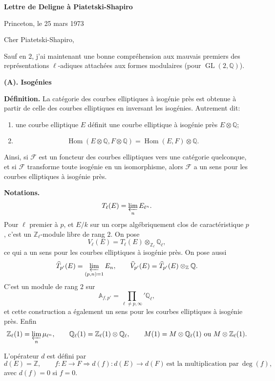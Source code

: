 \documentclass[11pt]{article}
\newcommand{\Q}{\mathbb{Q}}
\newcommand{\Z}{\mathbb{Z}}
\newcommand{\Ql}{\mathbb{Q}_{\ell}}
\newcommand{\Zl}{\mathbb{Z}_{\ell}}
\newcommand{\Afp}{\mathbb{A}_{f,p'}}
\newcommand{\Hom}{\operatorname{Hom}}
\newcommand{\GL}{\operatorname{GL}}
\newcommand{\Prolim}{\varprojlim}
\newcommand{\wh}{\widehat}
\begin{document}
\begin{center}
{\large\bfseries Lettre de Deligne à Piatetski-Shapiro}
\end{center}

\begin{flushright}
Princeton, le 25 mars 1973
\end{flushright}

Cher Piatetski-Shapiro,

Sauf en \(2\), j'ai maintenant une bonne compréhension aux mauvais premiers des représentations \(\ell\)-adiques attachées aux formes modulaires (pour \(\GL(2,\Q)\)).

\begin{center}
\textbf{(A). Isogénies}
\end{center}

\textbf{Définition.} La catégorie des courbes elliptiques à isogénie près est obtenue à partir de celle des courbes elliptiques en inversant les isogénies. Autrement dit:
\begin{enumerate}[label=(\alph*)]
\item une courbe elliptique \(E\) définit une courbe elliptique à isogénie près \(E\otimes\Q\);
\item
\[
\Hom(E\otimes\Q,F\otimes\Q)=\Hom(E,F)\otimes\Q .
\]
\end{enumerate}
Ainsi, si \(\mathcal F\) est un foncteur des courbes elliptiques vers une catégorie quelconque, et si \(\mathcal F\) transforme toute isogénie en un isomorphisme, alors \(\mathcal F\) a un sens pour les courbes elliptiques à isogénie près.

\textbf{Notations.}
\[
T_{\ell}(E)=\Prolim_n E_{\ell^n}.
\]
Pour \(\ell\) premier à \(p\), et \(E/k\) sur un corps algébriquement clos de caractéristique \(p\), c'est un \(\Zl\)-module libre de rang \(2\). On pose
\[
V_{\ell}(E)=T_{\ell}(E)\otimes_{\Zl}\Ql ,
\]
ce qui a un sens pour les courbes elliptiques à isogénie près. On pose aussi
\[
\wh{T}_{p'}(E)=\Prolim_{(p,n)=1}E_n,\qquad
\wh{V}_{p'}(E)=\wh{T}_{p'}(E)\otimes_{\Z}\Q .
\]
C'est un module de rang \(2\) sur
\[
\Afp=\prod_{\ell\neq p,\infty}'\Ql ,
\]
et cette construction a également un sens pour les courbes elliptiques à isogénie près. Enfin
\[
\Zl(1)=\Prolim_n\mu_{\ell^n},\qquad
\Ql(1)=\Zl(1)\otimes\Ql,\qquad
M(1)=M\otimes\Ql(1)\ \text{ou}\ M\otimes\Zl(1).
\]

L'opérateur \(d\) est défini par
\[
d(E)=\Z,\qquad
f:E\to F\Longrightarrow d(f):d(E)\to d(F)\ \text{est la multiplication par}\ \deg(f),
\]
avec \(d(f)=0\) si \(f=0\).
\end{document}
